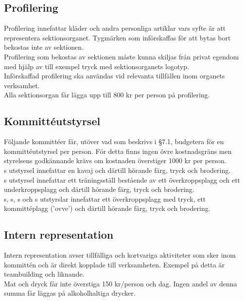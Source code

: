\documentclass[11pt, includeaddress]{classes/cthit}
\begin{document}
\subsection{Profilering}
Profilering innefattar kläder och andra personliga artiklar vars syfte är att representera sektionsorganet. 
Tygmärken som införskaffas för att bytas bort bekostas inte av sektionen. \\

Profilering som bekostas av sektionen måste kunna skiljas från privat egendom med hjälp av till exempel tryck med sektionsorganets logotyp. \\

Införskaffad profilering ska användas vid relevanta tillfällen inom organets verksamhet. \\

Alla sektionsorgan får lägga upp till 800 kr per person på profilering.

\subsection{Kommittéutstyrsel}
Följande kommittéer får, utöver vad som beskrivs i §7.1, budgetera för en kommittéutstyrsel per person. 
För detta finns ingen övre kostnadsgräns men styrelsens godkännande krävs om kostnaden överstiger 1000 kr per person. \\

\ARMIT{}s utstyrsel innefattar en kavaj och därtill hörande färg, tryck och brodering. \\

\FRITID{}s utstyrsel innefattar ett träningsställ bestående av ett överkroppsplagg och ett underkroppsplagg och därtill hörande färg, tryck och brodering. \\

\FLASHIT{}s, \NOLLKIT{}s, \PRIT{}s och \SEXIT{}s utstyrslar innefattar ett överkroppsplagg med tryck, ett kommittéplagg (’ovve’) och därtill hörande färg, tryck och brodering.

\subsection{Intern representation}
Intern representation avser tillfälliga och kortvariga aktiviteter som sker inom kommittén och är direkt kopplade till verksamheten. Exempel på detta är teambuilding och liknande. \\

Mat och dryck får inte överstiga 150 kr/person och dag. Ingen andel av denna summa får läggas på alkoholhaltiga drycker. \\
\end{document}
